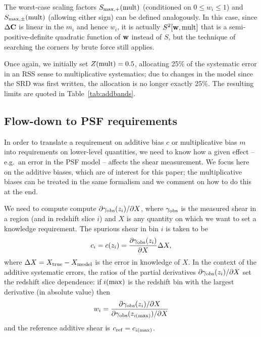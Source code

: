 \documentclass[aps,prd, amsmath,amssymb,superscriptaddress,showkeys,nofootinbib,reprint,preprintnumbers]{revtex4-1}
\begin{document}
The worst-case scaling factors $S_{\rm max,+}({\rm mult})$ (conditioned on $0\le w_i\le 1$) and $S_{\rm max,\pm}({\rm mult})$ (allowing either sign) can be defined analogously. In this case, since $\Delta{\bf C}$ is linear in the $m_i$ and hence $w_i$, it is actually $S^2[{\bf w},{\rm mult}]$ that is a semi-positive-definite quadratic function of ${\bf w}$ instead of $S$, but the technique of searching the corners by brute force still applies.

Once again, we initially set $Z({\rm mult})=0.5$, allocating 25\% of the systematic error in an RSS sense to multiplicative systematics; due to changes in the model since the SRD was first written, the allocation is no longer exactly 25\%. The resulting limits are quoted in Table~\ref{tab:addbands}.

\subsection{Flow-down to PSF requirements}


In order to translate a requirement on additive bias $c$ or multiplicative bias $m$ into requirements on lower-level quantities, we need to know how a given effect -- e.g.\ an error in the PSF model -- affects the shear measurement. We focus here on the additive biases, which are of interest for this paper; the multiplicative biases can be treated in the same formalism and we comment on how to do this at the end.

We need to compute compute $\partial\gamma_{\rm obs}(z_i)/\partial X$, where $\gamma_{\rm obs}$ is the measured shear in a region (and in redshift slice $i$) and $X$ is any quantity on which we want to set a knowledge requirement. The spurious shear in bin $i$ is taken to be
\begin{equation}
c_i = c(z_i) = \frac{\partial\gamma_{\rm obs}(z_i)}{\partial X} \Delta X,
\label{eq:X-shape}
\end{equation}
where $\Delta X = X_{\rm true} - X_{\rm model}$ is the error in
knowledge of $X$. In the context of the additive systematic errors,
the ratios of the partial derivatives $\partial\gamma_{\rm
obs}(z_i)/\partial X$ set the redshift slice dependence: if $i({\rm
max})$ is the redshift bin with the largest derivative (in absolute
value) then
\begin{equation}
w_i = \frac{\partial\gamma_{\rm obs}(z_i)/\partial X}{\partial\gamma_{\rm obs}(z_{i({\rm max})})/\partial X}
\end{equation}
and the reference additive shear is $c_{\rm ref} = c_{i({\rm max})}$.
\end{document}
